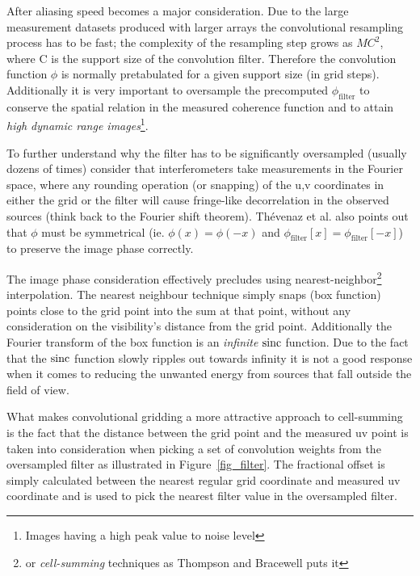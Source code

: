  After aliasing speed becomes a major consideration. Due to the large measurement datasets produced with larger arrays the convolutional resampling process
 has to be fast; the complexity of the resampling step grows as $MC^2$, where C is the support size of the convolution filter. Therefore
 the convolution function $\phi$ is normally pretabulated for a given support size (in grid steps). Additionally it is very important to oversample
 the precomputed $\phi_{\text{filter}}$ to conserve the spatial relation in the measured coherence function and to attain 
 \emph{high dynamic range images}\footnote{Images having a high peak value to noise level}.
 
 To further understand why the filter has to be significantly oversampled (usually dozens of times) consider that interferometers take measurements 
 in the Fourier space, where any rounding operation (or snapping) of the u,v coordinates in either the grid
 or the filter will cause fringe-like decorrelation in the observed sources (think back to the Fourier shift theorem). Th\'evenaz et al. \cite{thevenaz2000image} 
 also points out that $\phi$ must be symmetrical (ie. $\phi{(x)} = \phi{(-x)}$ and $\phi_{\text{filter}}[x] = \phi_{\text{filter}}[-x]$) to preserve 
 the image phase correctly.

 The image phase consideration effectively precludes using nearest-neighbor\footnote{or \textit{cell-summing} techniques as 
 Thompson and Bracewell \cite{thompson1974interpolation} puts it} interpolation. The nearest neighbour technique simply snaps (box function) 
 points close to the grid point into the sum at that point, without any consideration on the visibility's distance from the grid point. Additionally 
 the Fourier transform of the box function is an \emph{infinite} $\operatorname*{sinc}$ function.  Due to the fact that the $\operatorname*{sinc}$ function slowly ripples out 
 towards infinity it is not a good response when it comes to reducing the unwanted energy from sources that fall outside the field of view.
 
 What makes convolutional gridding a more attractive approach to cell-summing is the fact that the distance between the grid point and the
 measured uv point is taken into consideration when picking a set of convolution weights from the oversampled filter as illustrated in 
 Figure~\ref{fig_filter}. The fractional offset is simply calculated between the nearest regular grid coordinate and measured uv coordinate and is used to pick
 the nearest filter value in the oversampled filter.
 
